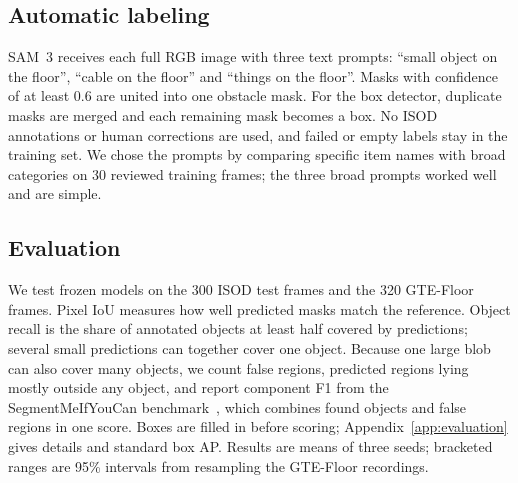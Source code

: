 \documentclass[conference]{IEEEtran}
\begin{document}
\subsection{Automatic labeling}\label{automatic-labeling}

SAM~3 receives each full RGB image with three text prompts: ``small
object on the floor'', ``cable on the floor'' and ``things on the
floor''. Masks with confidence of at least 0.6 are united into one
obstacle mask. For the box detector, duplicate masks are merged and each
remaining mask becomes a box. No ISOD annotations or human corrections
are used, and failed or empty labels stay in the training set. We chose
the prompts by comparing specific item names with broad categories on 30
reviewed training frames; the three broad prompts worked well and are
simple.


\subsection{Evaluation}\label{evaluation}

We test frozen models on the 300 ISOD test frames and the 320 GTE-Floor
frames. Pixel IoU measures how well predicted masks match the reference.
Object recall is the share of annotated objects at least half covered by
predictions; several small predictions can together cover one object.
Because one large blob can also cover many objects, we count false
regions, predicted regions lying mostly outside any object, and report
component F1 from the SegmentMeIfYouCan benchmark~\cite{chan2021segment},
which combines found objects and false regions in one score. Boxes are
filled in before scoring; Appendix~\ref{app:evaluation} gives details and
standard box AP. Results are means of three seeds; bracketed ranges are
95\% intervals from resampling the GTE-Floor recordings.







\onecolumn
\appendices

\end{document}
